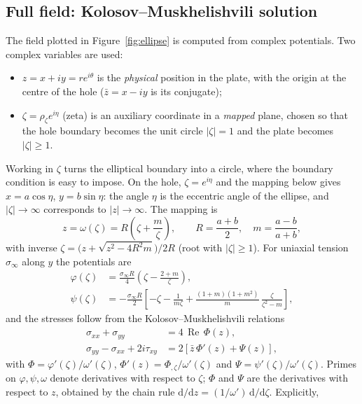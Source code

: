 \documentclass[11pt,a4paper]{article}
\newcommand{\dd}{\mathrm{d}}
\renewcommand{\Re}{\operatorname{Re}}
\begin{document}
\subsection{Full field: Kolosov--Muskhelishvili solution}
The field plotted in Figure~\ref{fig:ellipse} is computed from complex potentials. Two complex
variables are used:
\begin{itemize}
  \item $z = x+iy = re^{i\theta}$ is the \emph{physical} position in the plate, with the origin at the
  centre of the hole ($\bar z = x-iy$ is its conjugate);
  \item $\zeta = \rho_\zeta e^{i\eta}$ (zeta) is an auxiliary coordinate in a \emph{mapped} plane, chosen so that
  the hole boundary becomes the unit circle $|\zeta|=1$ and the plate becomes $|\zeta|\ge1$.
\end{itemize}
Working in $\zeta$ turns the elliptical boundary into a circle, where the boundary condition is easy
to impose. On the hole, $\zeta=e^{i\eta}$ and the mapping below gives $x=a\cos\eta$, $y=b\sin\eta$:
the angle $\eta$ is the eccentric angle of the ellipse, and $|\zeta|\to\infty$ corresponds to
$|z|\to\infty$. The mapping is
\begin{equation}
  z = \omega(\zeta) = R\left(\zeta + \frac{m}{\zeta}\right),\qquad
  R=\frac{a+b}{2},\quad m = \frac{a-b}{a+b},
\end{equation}
with inverse $\zeta = \bigl(z+\sqrt{z^2-4R^2m}\bigr)/2R$ (root with $|\zeta|\ge 1$).
For uniaxial tension $\sigma_\infty$ along $y$ the potentials are
\begin{align}
  \varphi(\zeta) &= \frac{\sigma_\infty R}{4}\left(\zeta - \frac{2+m}{\zeta}\right),\\
  \psi(\zeta) &= -\frac{\sigma_\infty R}{2}\left[-\zeta - \frac{1}{m\zeta}
      + \frac{(1+m)(1+m^2)}{m}\,\frac{\zeta}{\zeta^2-m}\right],
\end{align}
and the stresses follow from the Kolosov--Muskhelishvili relations
\begin{align}
  \sigma_{xx}+\sigma_{yy} &= 4\,\Re\,\Phi(z), \\
  \sigma_{yy}-\sigma_{xx}+2i\tau_{xy} &= 2\left[\bar z\,\Phi'(z)+\Psi(z)\right],
\end{align}
with $\Phi = \varphi'(\zeta)/\omega'(\zeta)$, $\Phi'(z) = \Phi_{,\zeta}/\omega'(\zeta)$ and
$\Psi = \psi'(\zeta)/\omega'(\zeta)$. Primes on $\varphi,\psi,\omega$ denote derivatives with
respect to $\zeta$; $\Phi$ and $\Psi$ are the derivatives with respect to $z$, obtained by the chain rule
$\dd/\dd z = (1/\omega')\,\dd/\dd\zeta$. Explicitly,
\end{document}
